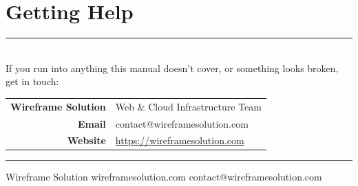 \documentclass[11pt,a4paper]{article}
\newcommand{\mysection}[1]{%
  \section{#1}%
  \vspace{-3mm}
  {\color{brandTeal}\rule{\linewidth}{1.1pt}}\\[2mm]
}
\begin{document}
\newpage

\mysection{Getting Help}

If you run into anything this manual doesn't cover, or something looks
broken, get in touch:

\begin{center}
\begin{tabular}{@{}rl@{}}
  \textbf{Wireframe Solution} & Web \& Cloud Infrastructure Team \\
  \textbf{Email} & contact@wireframesolution.com \\
  \textbf{Website} & \url{https://wireframesolution.com} \\
\end{tabular}
\end{center}

\vspace{6mm}
{\color{brandTeal}\rule{\linewidth}{1.1pt}}
\vspace{2mm}
\begin{center}
  {\footnotesize\color{brandGray} Wireframe Solution \textbullet{} wireframesolution.com \textbullet{} contact@wireframesolution.com}
\end{center}
\end{document}
